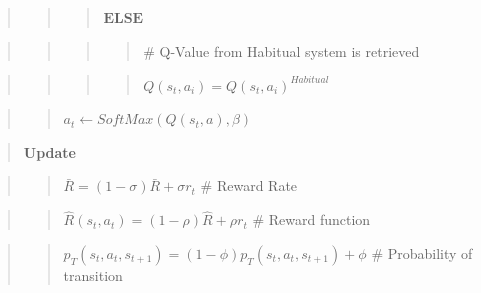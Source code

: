 \documentclass[10pt,a4paper,onecolumn]{article}
\begin{document}
\begin{quote}
\begin{quote}
\begin{quote}
\(\textbf{ELSE}\)
\end{quote}
\end{quote}
\end{quote}

\begin{quote}
\begin{quote}
\begin{quote}
\begin{quote}
\(\#\) Q-Value from Habitual system is retrieved
\end{quote}
\end{quote}
\end{quote}
\end{quote}

\begin{quote}
\begin{quote}
\begin{quote}
\begin{quote}
\(Q(s_t,a_i) = Q(s_t,a_i)^{Habitual}\)
\end{quote}
\end{quote}
\end{quote}
\end{quote}

\begin{quote}
\begin{quote}
\(a_t \leftarrow \textit{SoftMax}(Q(s_t,a), \beta)\)
\end{quote}
\end{quote}

\begin{quote}
\textbf{Update}
\end{quote}

\begin{quote}
\begin{quote}
\(\bar{R} = (1-\sigma) \bar{R} + \sigma r_t\) \(\#\) Reward Rate
\end{quote}
\end{quote}

\begin{quote}
\begin{quote}
\(\hat{R}(s_t,a_t) =(1 - \rho) \hat{R} + \rho r_t\) \(\#\) Reward
function
\end{quote}
\end{quote}

\begin{quote}
\begin{quote}
\(p_{T}(s_t, a_t, s_{t+1}) = (1 - \phi) p_{T}(s_t, a_t, s_{t+1}) + \phi\)
\(\#\) Probability of transition
\end{quote}
\end{quote}
\end{document}

